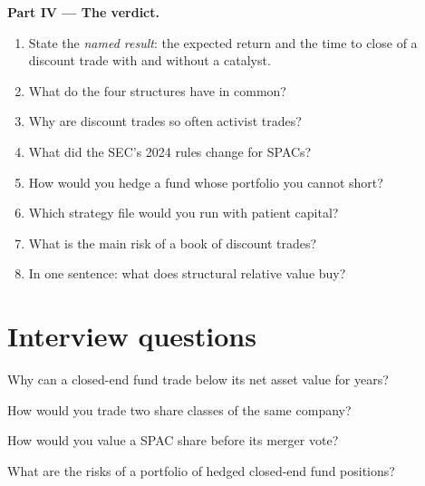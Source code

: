 \begin{problem}
\medskip\noindent\textbf{Part IV --- The verdict.}
\begin{enumerate}[resume]
\item State the \emph{named result}: the expected return and the time to close of a discount trade with and without a catalyst.
\item What do the four structures have in common?
\item Why are discount trades so often activist trades?
\item What did the SEC's 2024 rules change for SPACs?
\item How would you hedge a fund whose portfolio you cannot short?
\item Which strategy file would you run with patient capital?
\item What is the main risk of a book of discount trades?
\item In one sentence: what does structural relative value buy?
\end{enumerate}
\end{problem}

\section{Interview questions}

\begin{interviewq}\label{iq:s1:share-classes-holding-companies-closed-end-funds-spacs:1}
Why can a closed-end fund trade below its net asset value for years?
\end{interviewq}

\begin{interviewq}\label{iq:s1:share-classes-holding-companies-closed-end-funds-spacs:2}
How would you trade two share classes of the same company?
\end{interviewq}

\begin{interviewq}\label{iq:s1:share-classes-holding-companies-closed-end-funds-spacs:3}
How would you value a SPAC share before its merger vote?
\end{interviewq}

\begin{interviewq}\label{iq:s1:share-classes-holding-companies-closed-end-funds-spacs:4}
What are the risks of a portfolio of hedged closed-end fund positions?
\end{interviewq}

